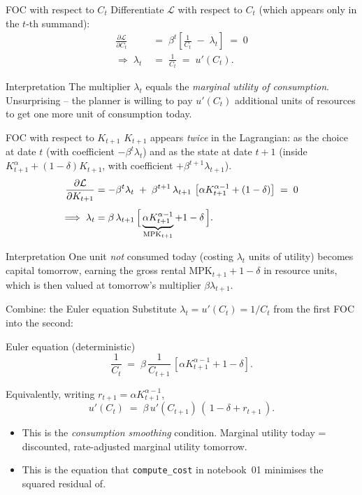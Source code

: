 \documentclass[aspectratio=169,11pt]{beamer}
\begin{document}
\begin{frame}{FOC with respect to $C_t$}
\small Differentiate $\mathcal{L}$ with respect to $C_t$ (which appears only in the $t$-th summand):
\begin{align*}
\frac{\partial \mathcal{L}}{\partial C_t} \;&=\; \beta^t \left[\frac{1}{C_t} \;-\; \lambda_t\right] \;=\; 0 \\[4pt]
\Longrightarrow\; \lambda_t \;&=\; \frac{1}{C_t} \;=\; u'(C_t).
\end{align*}
\begin{block}{Interpretation}
\small
The multiplier $\lambda_t$ equals the \emph{marginal utility of consumption}. Unsurprising -- the planner is willing to pay $u'(C_t)$ additional units of resources to get one more unit of consumption today.
\end{block}
\end{frame}

\begin{frame}{FOC with respect to $K_{t+1}$}
\small $K_{t+1}$ appears \emph{twice} in the Lagrangian: as the choice at date $t$ (with coefficient $-\beta^t \lambda_t$) and as the state at date $t+1$ (inside $K_{t+1}^\alpha + (1-\delta)K_{t+1}$, with coefficient $+\beta^{t+1}\lambda_{t+1}$).
\begin{align*}
\frac{\partial \mathcal{L}}{\partial K_{t+1}}
&= -\beta^t \lambda_t \;+\; \beta^{t+1}\,\lambda_{t+1}\,\left[\alpha K_{t+1}^{\alpha-1} + (1-\delta)\right] \;=\; 0 \\[4pt]
\Longrightarrow\; \lambda_t &= \beta\,\lambda_{t+1}\,\Bigl[\,\underbrace{\alpha K_{t+1}^{\alpha-1}}_{\text{MPK}_{t+1}} + 1 - \delta\,\Bigr].
\end{align*}
\begin{block}{Interpretation}
\small
One unit \emph{not} consumed today (costing $\lambda_t$ units of utility) becomes capital tomorrow, earning the gross rental $\mathrm{MPK}_{t+1} + 1-\delta$ in resource units, which is then valued at tomorrow's multiplier $\beta\lambda_{t+1}$.
\end{block}
\end{frame}

\begin{frame}{Combine: the Euler equation}
\small Substitute $\lambda_t = u'(C_t) = 1/C_t$ from the first FOC into the second:
\begin{block}{Euler equation (deterministic)}
\[
\frac{1}{C_t} \;=\; \beta\,\frac{1}{C_{t+1}}\,\left[\alpha K_{t+1}^{\alpha-1} + 1 - \delta\right].
\]
\end{block}
\vspace{6pt}
Equivalently, writing $r_{t+1} = \alpha K_{t+1}^{\alpha-1}$,
\[
u'(C_t) \;=\; \beta\, u'(C_{t+1}) \,(\,1 - \delta + r_{t+1}\,).
\]
\vspace{2pt}
\begin{itemize}\itemsep2pt
\item This is the \emph{consumption smoothing} condition. Marginal utility today = discounted, rate-adjusted marginal utility tomorrow.
\item This is the equation that \texttt{compute\_cost} in notebook~01 minimises the squared residual of.
\end{itemize}
\end{frame}
\end{document}
